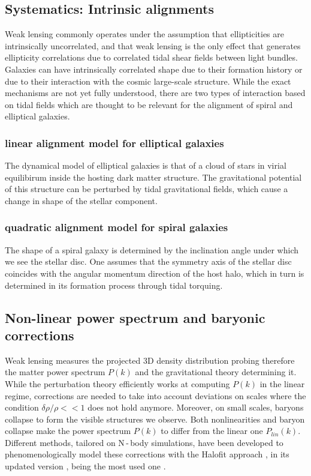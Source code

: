 \subsection{Systematics: Intrinsic alignments}
\label{sec:WL_IA}

Weak lensing commonly operates under the assumption that ellipticities are intrinsically uncorrelated, and that weak lensing is the only effect that generates ellipticity correlations due to correlated tidal shear fields between light bundles. Galaxies can have intrinsically correlated shape due to their formation history or due to their interaction with the cosmic large-scale structure. While the exact mechanisms are not yet fully understood, there are two types of interaction based on tidal fields which are thought to be relevant for the alignment of spiral and elliptical galaxies.

\subsubsection{linear alignment model for elliptical galaxies}
The dynamical model of elliptical galaxies is that of a cloud of stars in virial equilibirum inside the hosting dark matter structure. The gravitational potential of this structure can be perturbed by tidal gravitational fields, which cause a change in shape of the stellar component. 


\subsubsection{quadratic alignment model for spiral galaxies}
The shape of a spiral galaxy is determined by the inclination angle under which we see the stellar disc. One assumes that the symmetry axis of the stellar disc coincides with the angular momentum direction of the host halo, which in turn is determined in its formation process through tidal torquing.



\subsection{Non-linear power spectrum and baryonic corrections}
\label{sec:WL_NL_power}

Weak lensing measures the projected 3D density distribution probing therefore the matter power spectrum $P(k)$ and the gravitational theory determining it. While the perturbation theory efficiently works at computing $P(k)$ in the linear regime, corrections are needed to take into account deviations on scales where the condition $\delta \rho/\rho << 1$ does not hold anymore. Moreover, on small scales, baryons collapse to form the visible structures we observe. Both nonlinearities and baryon collapse make the power spectrum $P(k)$ to differ from the linear one $P_{lin}(k)$. Different methods, tailored on N\,-\,body simulations, have been developed to phenomenologically model these corrections with the Halofit approach \cite{HaloFit}, in its updated version \cite{Taka,Bird_Viel_Haehnelt_2012}, being the most used one .  

